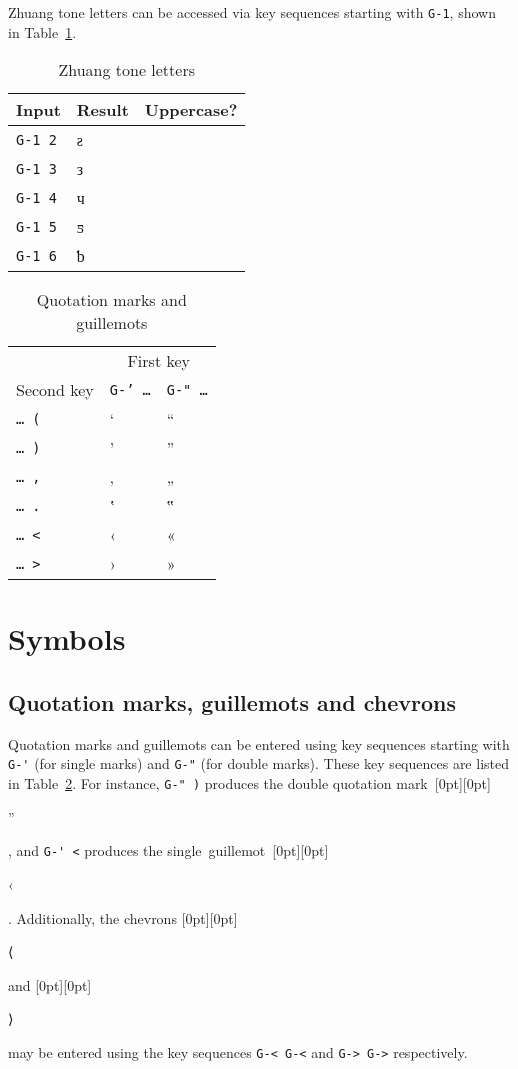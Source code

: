\documentclass[oneside]{memoir}
\newcommand{\cmark}{\ding{51}}
\newcommand{\key}{\verb}
\newcommand{\keynv}{\texttt}
\newcommand{\out}[1]{\raisebox{0pt}[0pt][0pt]{\setlength{\fboxsep}{1pt}\colorbox{gray!20}{\strut{}#1}}}
\begin{document}
{{{Zhuang tone letters can be accessed via key sequences starting with \key|G-1|, shown in Table~\ref{tab:zhuang_tones}.

\begin{table}[b]
\centering
\caption{Zhuang tone letters}
\label{tab:zhuang_tones}
\centering
\begin{tabular}{lll}
\toprule
Input & Result & Uppercase? \\
\midrule
\key|G-1 2| & ƨ & \cmark \\
\key|G-1 3| & з & \cmark \\
\key|G-1 4| & ч & \cmark \\
\key|G-1 5| & ƽ & \cmark \\
\key|G-1 6| & ƅ & \cmark \\
\bottomrule
\end{tabular}
\end{table}

\begin{table}[t]
\caption{Quotation marks and guillemots}
\label{tab:quotes_guillemots}
\centering
\begin{tabular}{lll}
\toprule
& \multicolumn{2}{c}{First key} \\
\cmidrule(l){2-3}
Second key & \keynv{G-' …} & \keynv{G-" …} \\
\midrule
\keynv{… (} & ‘ & “ \\
\keynv{… )} & ’ & ” \\
\keynv{… ,} & ‚ & „ \\
\keynv{… .} & ‛ & ‟ \\
\keynv{… <} & ‹ & « \\
\keynv{… >} & › & » \\
\bottomrule
\end{tabular}
\end{table}

\section{Symbols}
\label{sec:symbols}

\subsection{Quotation marks, guillemots and chevrons}
\label{sec:quotation_marks_guillemots_chevrons}

Quotation marks and guillemots can be entered using key sequences starting with
  \key|G-'| (for single marks) and \key|G-"| (for double marks).
These key sequences are listed in Table~\ref{tab:quotes_guillemots}.
For instance, \key|G-" )| produces the double quotation mark~\out{”}, and \key|G-' <| produces the single~guillemot~\out{‹}.
Additionally, the chevrons \out{⟨} and \out{⟩} may be entered using the key sequences \key|G-< G-<| and \key|G-> G->| respectively.

}}}
\end{document}
